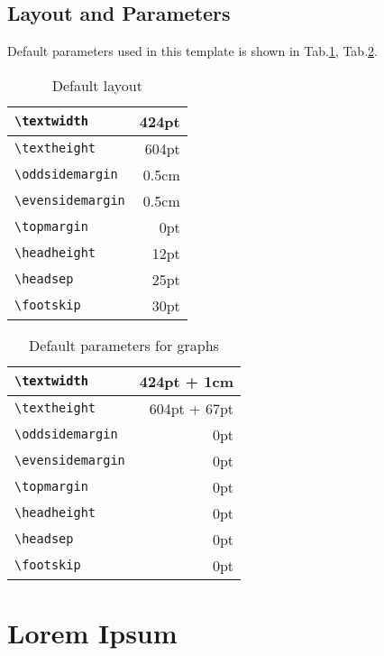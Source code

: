 \documentclass{kuee_en}
\begin{document}
\section{Layout and Parameters}
Default parameters used in this template is shown in Tab.\ref{tab:text}, Tab.\ref{tab:fig}.

\begin{table}
  \caption{Default layout}\label{tab:text}
  \begin{center}
    \begin{tabular}{|l|r|}
      \hline
      \verb+\textwidth+ & 424pt \\ \hline
      \verb+\textheight+ & 604pt \\ \hline
      \verb+\oddsidemargin+ & 0.5cm \\ \hline
      \verb+\evensidemargin+ & 0.5cm \\ \hline
      \verb+\topmargin+ & 0pt \\ \hline
      \verb+\headheight+ &12pt \\ \hline
      \verb+\headsep+ & 25pt \\ \hline
      \verb+\footskip+ & 30pt \\ \hline
    \end{tabular}
  \end{center}
\end{table}

\begin{table}
  \caption{Default parameters for graphs}\label{tab:fig}
  \begin{center}
    \begin{tabular}{|l|r|}
      \hline
      \verb+\textwidth+ & 424pt + 1cm \\ \hline
      \verb+\textheight+ & 604pt + 67pt \\ \hline
      \verb+\oddsidemargin+ & 0pt \\ \hline
      \verb+\evensidemargin+ & 0pt \\ \hline
      \verb+\topmargin+ & 0pt \\ \hline
      \verb+\headheight+ & 0pt \\ \hline
      \verb+\headsep+ & 0pt \\ \hline
      \verb+\footskip+ & 0pt \\ \hline
    \end{tabular}
  \end{center}
\end{table}


\chapter{Lorem Ipsum}
\lipsum[1-10]
\end{document}
